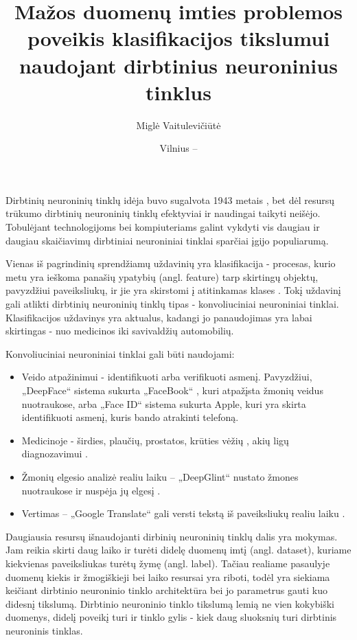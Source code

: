 \documentclass{VUMIFPSkursinis}
\title{Mažos duomenų imties problemos poveikis klasifikacijos tikslumui naudojant dirbtinius neuroninius tinklus}
\author{Miglė Vaitulevičiūtė}
\date{Vilnius – \the\year}
\begin{document}
  
\maketitle
\cleardoublepage{}
\setcounter{page}{2}

\tableofcontents

Dirbtinių neuroninių tinklų idėja buvo sugalvota 1943 metais \cite{firstIdea}, bet dėl resursų trūkumo dirbtinių neuroninių tinklų efektyviai ir naudingai taikyti neišėjo. 
Tobulėjant technologijoms bei kompiuteriams galint vykdyti vis daugiau ir daugiau skaičiavimų dirbtiniai neuroniniai tinklai sparčiai įgijo populiarumą.

Vienas iš pagrindinių sprendžiamų uždavinių yra klasifikacija - procesas, kurio metu yra ieškoma panašių ypatybių (angl. feature) tarp skirtingų objektų, pavyzdžiui paveiksliukų, ir jie yra skirstomi į atitinkamas klases \cite{classificationDef}. Tokį uždavinį gali atlikti dirbtinių neuroninių 
tinklų tipas - konvoliuciniai neuroniniai tinklai. Klasifikacijos uždavinys yra aktualus, kadangi jo panaudojimas yra labai skirtingas - nuo medicinos iki savivaldžių automobilių.

Konvoliuciniai neuroniniai tinklai gali būti naudojami:
\begin{itemize}
\item Veido atpažinimui - identifikuoti arba verifikuoti asmenį. Pavyzdžiui, „DeepFace“ sistema sukurta „FaceBook“ \cite{Taigman:2014:DCG:2679600.2680208}, kuri atpažįsta žmonių veidus nuotraukose, 
arba „Face ID“ sistema sukurta Apple, kuri yra skirta identifikuoti asmenį, kuris bando atrakinti telefoną. 
\item Medicinoje - širdies, plaučių, prostatos, krūties vėžių \cite{cancer}, akių ligų diagnozavimui \cite{eyedis}.
\item Žmonių elgesio analizė realiu laiku – „DeepGlint“ nustato žmones nuotraukose ir nuspėja jų elgesį \cite{deepGlint}.
\item Vertimas – „Google Translate“ gali versti tekstą iš paveiksliukų realiu laiku \cite{Raschka:2015:PML:2886323}.
\end{itemize}

Daugiausia resursų išnaudojanti dirbinių neuroninių tinklų dalis yra mokymas. Jam reikia skirti daug laiko ir turėti didelę duomenų imtį (angl. dataset), kuriame kiekvienas paveiksliukas turėtų žymę (angl. label). Tačiau realiame pasaulyje duomenų kiekis ir žmogiškieji bei laiko resursai yra riboti, 
todėl yra siekiama keičiant dirbtinio neuroninio tinklo architektūra bei jo parametrus gauti kuo didesnį tikslumą. 
Dirbtinio neuroninio tinklo tikslumą lemią ne vien kokybiški duomenys, didelį poveikį turi ir tinklo gylis - kiek daug sluoksnių turi dirbtinis neuroninis 
tinklas. 
\end{document}

